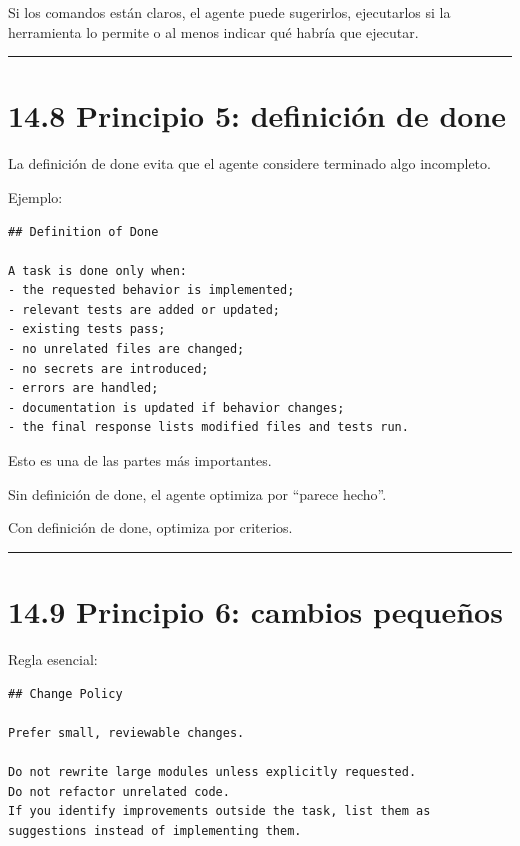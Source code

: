 Si los comandos están claros, el agente puede sugerirlos, ejecutarlos si
la herramienta lo permite o al menos indicar qué habría que ejecutar.

\begin{center}\rule{0.5\linewidth}{0.5pt}\end{center}

\section{14.8 Principio 5: definición de
done}\label{principio-5-definiciuxf3n-de-done}

La definición de done evita que el agente considere terminado algo
incompleto.

Ejemplo:

\begin{lstlisting}
## Definition of Done

A task is done only when:
- the requested behavior is implemented;
- relevant tests are added or updated;
- existing tests pass;
- no unrelated files are changed;
- no secrets are introduced;
- errors are handled;
- documentation is updated if behavior changes;
- the final response lists modified files and tests run.
\end{lstlisting}

Esto es una de las partes más importantes.

Sin definición de done, el agente optimiza por ``parece hecho''.

Con definición de done, optimiza por criterios.

\begin{center}\rule{0.5\linewidth}{0.5pt}\end{center}

\section{14.9 Principio 6: cambios
pequeños}\label{principio-6-cambios-pequeuxf1os}

Regla esencial:

\begin{lstlisting}
## Change Policy

Prefer small, reviewable changes.

Do not rewrite large modules unless explicitly requested.
Do not refactor unrelated code.
If you identify improvements outside the task, list them as suggestions instead of implementing them.
\end{lstlisting}

